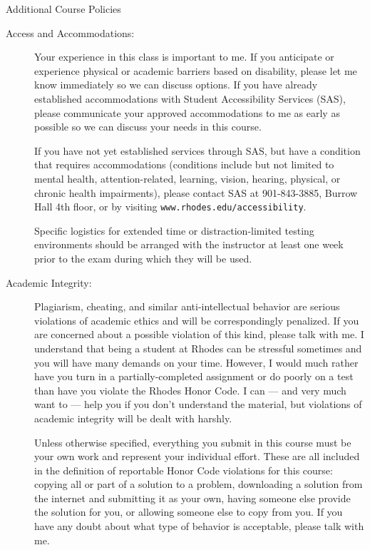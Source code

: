 \documentclass [letterpaper,11pt]{article}
\begin{document}
\begin{center}
\Large Additional Course Policies
\end{center}

\begin{description}

\item[Access and Accommodations:]
Your experience in this class is important to me.  If you anticipate or experience physical or academic barriers based on disability, please let me know immediately so we can discuss options.  If you have already established accommodations with Student Accessibility Services (SAS), please communicate your approved accommodations to me as early as possible so we can discuss your needs in this course.

If you have not yet established services through SAS, but have a condition that requires accommodations (conditions include but not limited to mental health, attention-related, learning, vision, hearing, physical, or chronic health impairments), please contact SAS at 901-843-3885, Burrow Hall 4th floor, or by visiting  \texttt{www.rhodes.edu/accessibility}.

Specific logistics for extended time or distraction-limited testing environments should be arranged with the instructor 
at least one week prior to the exam during which they 
will be used.

  \item[Academic Integrity:]
   Plagiarism, cheating, and similar anti-intellectual behavior are serious violations of academic ethics and will be correspondingly penalized. If you are concerned about a possible violation of this kind, please talk with me.  I understand that being a student at Rhodes 
can be stressful sometimes and you will have many demands on your time.  However, I would
much rather have you turn in a partially-completed assignment or do poorly on a test than
have you violate the Rhodes Honor Code.  I can --- and very much want to --- help you if you don't understand the material, but violations of academic integrity will be dealt with harshly.
   
Unless otherwise specified, everything you submit in this course must be your own work and represent
your individual effort.  These are all included in the definition of reportable Honor Code violations for this course:
copying all or part of a solution to a problem, downloading a solution from the internet and submitting it as your own, having someone else provide the solution for you, or allowing someone else to copy from you.    If you have any doubt about what type of behavior is acceptable, please talk with me.


\end{description}
\end{document}
